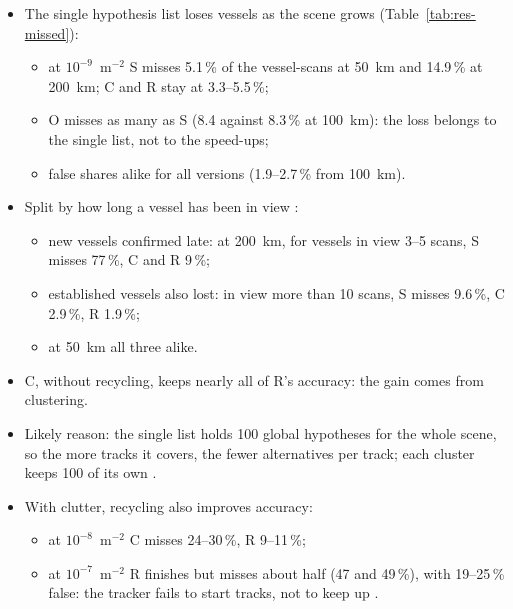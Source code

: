 \begin{itemize}
    \item The single hypothesis list loses vessels as the scene grows (Table~\ref{tab:res-missed}):
    \begin{itemize}
        \item at $10^{-9}$~m$^{-2}$ S misses 5.1\,\% of the vessel-scans at 50~km and 14.9\,\% at 200~km; C and R stay at 3.3--5.5\,\%;
        \item O misses as many as S (8.4 against 8.3\,\% at 100~km): the loss belongs to the single list, not to the speed-ups;
        \item false shares alike for all versions (1.9--2.7\,\% from 100~km).
    \end{itemize}
    \item Split by how long a vessel has been in view :
    \begin{itemize}
        \item new vessels confirmed late: at 200~km, for vessels in view 3--5 scans, S misses 77\,\%, C and R 9\,\%;
        \item established vessels also lost: in view more than 10 scans, S misses 9.6\,\%, C 2.9\,\%, R 1.9\,\%;
        \item at 50~km all three alike.
    \end{itemize}
    \item C, without recycling, keeps nearly all of R's accuracy: the gain comes from clustering.
    \item Likely reason: the single list holds 100 global hypotheses for the whole scene, so the more tracks it covers, the fewer alternatives per track; each cluster keeps 100 of its own .
    \item With clutter, recycling also improves accuracy:
    \begin{itemize}
        \item at $10^{-8}$~m$^{-2}$ C misses 24--30\,\%, R 9--11\,\%;
        \item at $10^{-7}$~m$^{-2}$ R finishes but misses about half (47 and 49\,\%), with 19--25\,\% false: the tracker fails to start tracks, not to keep up .
    \end{itemize}
\end{itemize}

